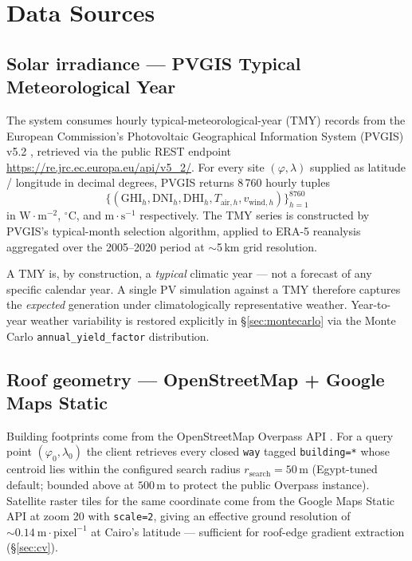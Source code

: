 \section{Data Sources}

\subsection{Solar irradiance --- PVGIS Typical Meteorological Year}

The system consumes hourly typical-meteorological-year (TMY) records
from the European Commission's Photovoltaic Geographical Information
System (PVGIS) v5.2 \citep{pvgis}, retrieved via the public REST
endpoint \url{https://re.jrc.ec.europa.eu/api/v5_2/}. For every site
$(\varphi, \lambda)$ supplied as latitude / longitude in decimal
degrees, PVGIS returns 8\,760 hourly tuples
\[
\bigl\{(\mathrm{GHI}_h, \mathrm{DNI}_h, \mathrm{DHI}_h, T_{\text{air},h},
v_{\text{wind},h})\bigr\}_{h=1}^{8760}
\]
in $\mathrm{W\cdot m^{-2}}$, ${}^{\circ}\mathrm{C}$, and
$\mathrm{m\cdot s^{-1}}$ respectively. The TMY series is constructed
by PVGIS's typical-month selection algorithm, applied to ERA-5
reanalysis aggregated over the 2005--2020 period at $\sim$5\,km grid
resolution.

A TMY is, by construction, a \emph{typical} climatic year --- not a
forecast of any specific calendar year. A single PV simulation
against a TMY therefore captures the \emph{expected} generation under
climatologically representative weather. Year-to-year weather
variability is restored explicitly in \S\ref{sec:montecarlo} via the
Monte Carlo \texttt{annual\_yield\_factor} distribution.

\subsection{Roof geometry --- OpenStreetMap + Google Maps Static}

Building footprints come from the OpenStreetMap Overpass API
\citep{osm-overpass}. For a query point $(\varphi_0, \lambda_0)$ the
client retrieves every closed \texttt{way} tagged \texttt{building=*}
whose centroid lies within the configured search radius
$r_{\text{search}} = 50\,\mathrm{m}$ (Egypt-tuned default; bounded
above at $500\,\mathrm{m}$ to protect the public Overpass instance).
Satellite raster tiles for the same coordinate come from the Google
Maps Static API at zoom 20 with \texttt{scale=2}, giving an effective
ground resolution of ${\sim}0.14~\mathrm{m\cdot pixel^{-1}}$ at
Cairo's latitude --- sufficient for roof-edge gradient extraction
(\S\ref{sec:cv}).

